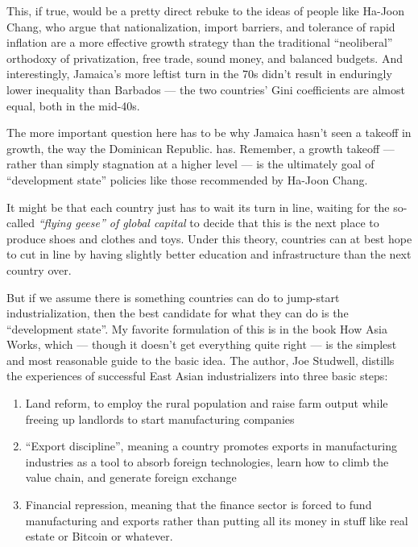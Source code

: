 \documentclass[
]{book}
\begin{document}
This, if true, would be a pretty direct rebuke to the ideas of people like Ha-Joon Chang, who argue that nationalization, import barriers, and tolerance of rapid inflation are a more effective growth strategy than the traditional ``neoliberal'' orthodoxy of privatization, free trade, sound money, and balanced budgets. And interestingly, Jamaica's more leftist turn in the 70s didn't result in enduringly lower inequality than Barbados --- the two countries' Gini coefficients are almost equal, both in the mid-40s.

The more important question here has to be why Jamaica hasn't seen a takeoff in growth, the way the Dominican Republic. has. Remember, a growth takeoff --- rather than simply stagnation at a higher level --- is the ultimately goal of ``development state'' policies like those recommended by Ha-Joon Chang.

It might be that each country just has to wait its turn in line, waiting for the so-called \emph{``flying geese'' of global capital} to decide that this is the next place to produce shoes and clothes and toys. Under this theory, countries can at best hope to cut in line by having slightly better education and infrastructure than the next country over.

But if we assume there is something countries can do to jump-start industrialization, then the best candidate for what they can do is the ``development state''. My favorite formulation of this is in the book How Asia Works, which --- though it doesn't get everything quite right --- is the simplest and most reasonable guide to the basic idea. The author, Joe Studwell, distills the experiences of successful East Asian industrializers into three basic steps:

\begin{enumerate}
\def\labelenumi{\arabic{enumi}.}
\item
  Land reform, to employ the rural population and raise farm output while freeing up landlords to start manufacturing companies
\item
  ``Export discipline'', meaning a country promotes exports in manufacturing industries as a tool to absorb foreign technologies, learn how to climb the value chain, and generate foreign exchange
\item
  Financial repression, meaning that the finance sector is forced to fund manufacturing and exports rather than putting all its money in stuff like real estate or Bitcoin or whatever.
\end{enumerate}
\end{document}
